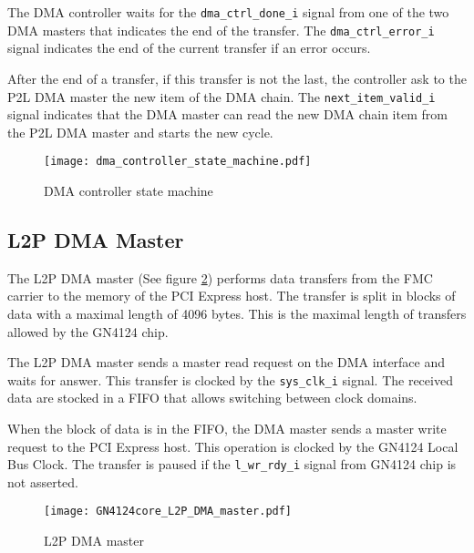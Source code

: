 \documentclass[10pt,a4paper]{cerndoc}
\begin{document}
The DMA controller waits for the \verb+dma_ctrl_done_i+ signal from one of the two DMA masters that indicates the end of the transfer. The \verb+dma_ctrl_error_i+ signal indicates the end of the current transfer if an error occurs.

After the end of a transfer, if this transfer is not the last, the controller ask to the P2L DMA master the new item of the DMA chain. The \verb+next_item_valid_i+ signal indicates that the DMA master can read the new DMA chain item from the P2L DMA master and starts the new cycle.


\begin{figure}[!ht]
 \centering
 \texttt{[image: dma\_controller\_state\_machine.pdf]}
 \caption{DMA controller state machine}
 \label{fig:GN4124core_dma_ctrl_state_machine}
\end{figure}

  \subsection{L2P DMA Master}
  The L2P DMA master (See figure \ref{fig:GN4124core_l2p_dma_master}) performs data transfers from the FMC carrier to the memory of the PCI Express host. The transfer is split in blocks of data with a maximal length of 4096 bytes. This is the maximal length of transfers allowed by the GN4124 chip.

  The L2P DMA master sends a master read request on the DMA interface and waits for answer. This transfer is clocked by the \verb+sys_clk_i+ signal. The received data are stocked in a FIFO that allows switching between clock domains.

  When the block of data is in the FIFO, the DMA master sends a master write request to the PCI Express host. This operation is clocked by the GN4124 Local Bus Clock. The transfer is paused if the \verb+l_wr_rdy_i+ signal from GN4124 chip is not asserted.



  \begin{figure}[!ht]
   \centering
   \texttt{[image: GN4124core\_L2P\_DMA\_master.pdf]}
   \caption{L2P DMA master}
   \label{fig:GN4124core_l2p_dma_master}
  \end{figure}
\end{document}
